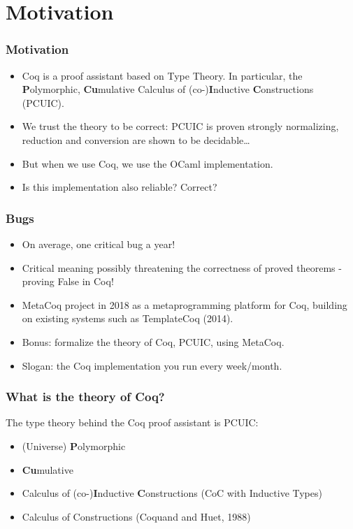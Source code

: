 \section{Motivation}
\label{sec:motivation}

\begin{frame}
    \frametitle{Motivation}
    \begin{itemize}
    \item Coq is a proof assistant based on Type Theory. In particular, the
        \textbf{P}olymorphic, \textbf{Cu}mulative Calculus of
        (co-)\textbf{I}nductive \textbf{C}onstructions (PCUIC).
    \item We trust the theory to be correct: PCUIC is proven strongly
        normalizing, reduction and conversion  are shown to be
        decidable\dots\pause
    \item But when we use Coq, we use the OCaml implementation. \pause
    \item Is this implementation also reliable? Correct?
    \end{itemize}
\end{frame}

\begin{frame}
    \frametitle{Bugs}
\begin{itemize}
\item On average, one critical bug a year!
\item Critical meaning possibly threatening the correctness of proved theorems -
    proving False in Coq!\pause
\item MetaCoq project in 2018 as a metaprogramming platform for Coq,
    building on existing systems such as TemplateCoq (2014).
\item Bonus: formalize the theory of Coq, PCUIC, using MetaCoq.\pause
\item Slogan: the Coq implementation you run every week/month.
\end{itemize}
\end{frame}

\begin{frame}
    \frametitle{What is the theory of Coq?}

    The type theory behind the Coq proof assistant is PCUIC:
    \begin{itemize}
    \item (Universe) \textbf{P}olymorphic 
    \item \textbf{Cu}mulative
    \item Calculus of (co-)\textbf{I}nductive \textbf{C}onstructions (CoC with Inductive Types)
    \item Calculus of Constructions (Coquand and Huet, 1988)
    \end{itemize}

\end{frame}

